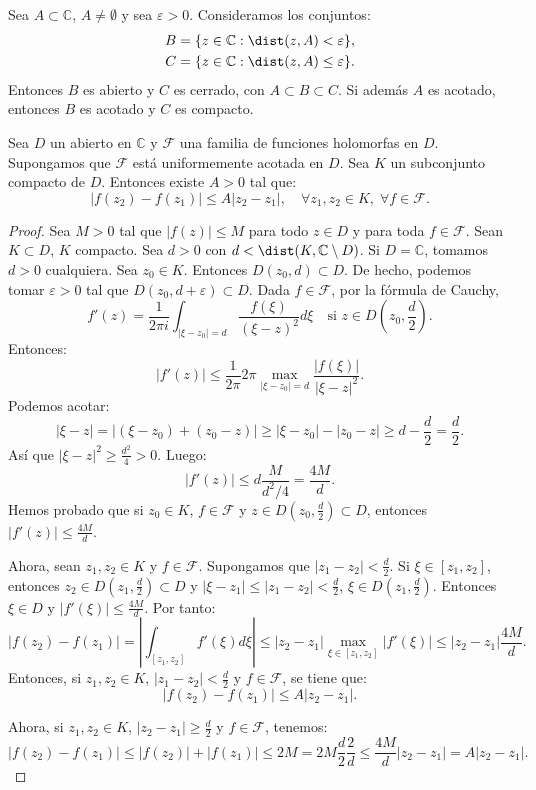 \begin{lemma}
    Sea $A \subset \mathbb{C}$, $A \neq \emptyset$ y sea $\varepsilon > 0$.
    Consideramos los conjuntos:
    \begin{align*}
        B & = \{z \in \mathbb{C} : \dist(z, A) < \varepsilon\},    \\
        C & = \{z \in \mathbb{C} : \dist(z, A) \leq \varepsilon\}.
    \end{align*}
    Entonces $B$ es abierto y $C$ es cerrado, con $A \subset B \subset C$.
    Si además $A$ es acotado, entonces $B$ es acotado y $C$ es compacto.
\end{lemma}

\begin{proposition}
    Sea $D$ un abierto en $\mathbb{C}$ y $\mathcal{F}$ una familia de funciones holomorfas en $D$.
    Supongamos que $\mathcal{F}$ está uniformemente acotada en $D$.
    Sea $K$ un subconjunto compacto de $D$.
    Entonces existe $A > 0$ tal que:
    $$|f(z_2)-f(z_1)| \leq A|z_2-z_1|, \quad \forall z_1, z_2 \in K, \; \forall f \in \mathcal{F}.$$
\end{proposition}

\begin{proof}
    Sea $M > 0$ tal que $|f(z)| \leq M$ para todo $z \in D$ y para toda $f \in \mathcal{F}$.
    Sean $K \subset D$, $K$ compacto.
    Sea $d > 0$ con $d < \dist(K, \mathbb{C} \setminus D)$.
    Si $D = \mathbb{C}$, tomamos $d > 0$ cualquiera.
    Sea $z_0 \in K$.
    Entonces $D(z_0, d) \subset D$.
    De hecho, podemos tomar $\varepsilon > 0$ tal que $D(z_0, d+\varepsilon) \subset D$.
    Dada $f \in \mathcal{F}$, por la fórmula de Cauchy,
    $$f'(z) = \frac{1}{2\pi i} \int_{|\xi-z_0|=d} \frac{f(\xi)}{(\xi-z)^2}d\xi \quad \text{si } z \in D\left(z_0, \frac{d}{2}\right).$$
    Entonces:
    $$|f'(z)| \leq \frac{1}{2\pi}2\pi \max_{|\xi-z_0|=d} \frac{|f(\xi)|}{|\xi-z|^2}.$$
    Podemos acotar:
    $$|\xi-z| = |(\xi-z_0) + (z_0-z)| \geq |\xi-z_0| - |z_0-z| \geq d - \frac{d}{2} = \frac{d}{2}.$$
    Así que $|\xi-z|^2 \geq \frac{d^2}{4} > 0$.
    Luego:
    $$|f'(z)| \leq d\frac{M}{d^2/4} = \frac{4M}{d}.$$
    Hemos probado que si $z_0 \in K$, $f \in \mathcal{F}$ y $z \in D\left(z_0, \frac{d}{2}\right) \subset D$, entonces $|f'(z)| \leq \frac{4M}{d}$.

    Ahora, sean $z_1, z_2 \in K$ y $f \in \mathcal{F}$.
    Supongamos que $|z_1-z_2| < \frac{d}{2}$.
    Si $\xi \in [z_1, z_2]$, entonces $z_2 \in D\left(z_1, \frac{d}{2}\right) \subset D$ y $|\xi-z_1| \leq |z_1-z_2| < \frac{d}{2}$, $\xi \in D\left(z_1, \frac{d}{2}\right)$.
    Entonces $\xi \in D$ y $|f'(\xi)| \leq \frac{4M}{d}$.
    Por tanto:
    $$|f(z_2)-f(z_1)| = \left|\int_{[z_1, z_2]} f'(\xi)d\xi\right| \leq |z_2-z_1| \max_{\xi \in [z_1, z_2]} |f'(\xi)| \leq |z_2-z_1| \frac{4M}{d}.$$
    Entonces, si $z_1, z_2 \in K$, $|z_1-z_2| < \frac{d}{2}$ y $f \in \mathcal{F}$, se tiene que:
    $$|f(z_2)-f(z_1)| \leq A|z_2-z_1|.$$

    Ahora, si $z_1, z_2 \in K$, $|z_2-z_1| \geq \frac{d}{2}$ y $f \in \mathcal{F}$, tenemos:
    $$|f(z_2)-f(z_1)| \leq |f(z_2)| + |f(z_1)| \leq 2M = 2M \frac{d}{2}\frac{2}{d} \leq \frac{4M}{d}|z_2-z_1| = A|z_2-z_1|.$$
\end{proof}

